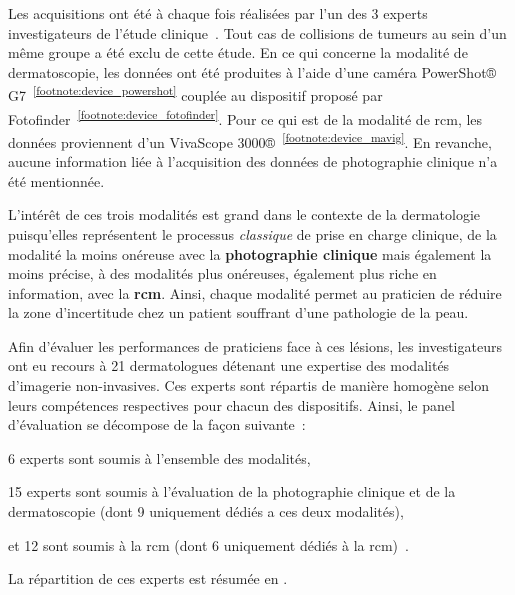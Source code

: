 Les acquisitions ont été à chaque fois réalisées par l'un des 3 experts investigateurs de l'étude clinique~\cite{Cinotti2018}. Tout cas de collisions de tumeurs au sein d'un même groupe a été exclu de cette étude. En ce qui concerne la modalité de dermatoscopie, les données ont été produites à l'aide d'une caméra PowerShot® G7~\textsuperscript{\ref{footnote:device_powershot}} couplée au dispositif proposé par Fotofinder~\textsuperscript{\ref{footnote:device_fotofinder}}. Pour ce qui est de la modalité de \gls{rcm}, les données proviennent d'un VivaScope 3000®~\textsuperscript{\ref{footnote:device_mavig}}. En revanche, aucune information liée à l'acquisition des données de photographie clinique n'a été mentionnée.\par

L'intérêt de ces trois modalités est grand dans le contexte de la dermatologie puisqu'elles représentent le processus \textit{classique} de prise en charge clinique, de la modalité la moins onéreuse avec la \textbf{photographie clinique} mais également la moins précise, à des modalités plus onéreuses, également plus riche en information, avec la \textbf{\gls{rcm}}. Ainsi, chaque modalité permet au praticien de réduire la zone d'incertitude chez un patient souffrant d'une pathologie de la peau.

\addtocounter{footnote}{1}
\addtocounter{footnote}{1}
\addtocounter{footnote}{1}

Afin d'évaluer les performances de praticiens face à ces lésions, les investigateurs ont eu recours à 21 dermatologues détenant une expertise des modalités d'imagerie non-invasives. Ces experts sont répartis de manière homogène selon leurs compétences respectives pour chacun des dispositifs. Ainsi, le panel d'évaluation se décompose de la façon suivante~: 
\begin{inlinerate}
    \item 6 experts sont soumis à l'ensemble des modalités,
    \item 15 experts sont soumis à l'évaluation de la photographie clinique et de la dermatoscopie (dont 9 uniquement dédiés a ces deux modalités),
    \item et 12 sont soumis à la \gls{rcm} (dont 6 uniquement dédiés à la \gls{rcm})~\cite{Cinotti2018}.
\end{inlinerate}
La répartition de ces experts est résumée en .\par

